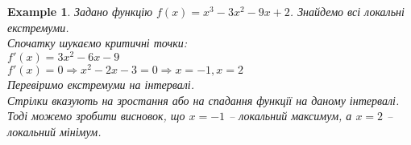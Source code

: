 \documentclass[a4paper, 14pt]{article}
\theoremstyle{theoremdd}
\theoremstyle{theoremdd}
\theoremstyle{theoremdd}
\theoremstyle{theoremdd}
\newtheorem{example}[theorem]{Example}
\theoremstyle{theoremdd}
\theoremstyle{theoremdd}
\theoremstyle{theoremdd}
\theoremstyle{theoremdd}
\begin{document}
\begin{example}
Задано функцію $f(x) = x^3-3x^2-9x+2$. Знайдемо всі локальні екстремуми.\\
Спочатку шукаємо критичні точки:\\
$f'(x) = 3x^2-6x-9$\\
$f'(x) = 0 \Rightarrow x^2-2x-3 = 0 \Rightarrow x = -1,x = 2$\\
Перевіримо екстремуми на інтервалі.
\\ \iffalse %
\begin{figure}[H]
\centering
\begin{tikzpicture}
\draw[thick, ->] (-3,0)--(4,0) node[below = 2pt] {$x$};
\draw[thick] (-1,-0.25)--(-1,0.25) node[below = 10pt] {$-1$};
\draw[thick] (2,-0.25)--(2,0.25) node[below = 10pt] {$2$};
\draw[thick, ->] (-2,0.5)--(-1.5,1);
\draw[thick, ->] (0,1)--(0.5,0.5);
\draw[thick, ->] (2.5,0.5)--(3,1);
\end{tikzpicture}
\end{figure}
\fi %
Стрілки вказують на зростання або на спадання функції на даному інтервалі. Тоді можемо зробити висновок, що $x=-1$ -- локальний максимум, а $x=2$ -- локальний мінімум.
\end{example}
\end{document}
